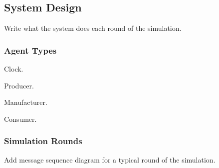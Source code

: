 \subsection{System Design}

Write what the system does each round of the simulation.

\subsubsection{Agent Types}

Clock.

Producer.

Manufacturer.

Consumer.

\subsubsection{Simulation Rounds}

Add message sequence diagram for a typical round of the simulation.
